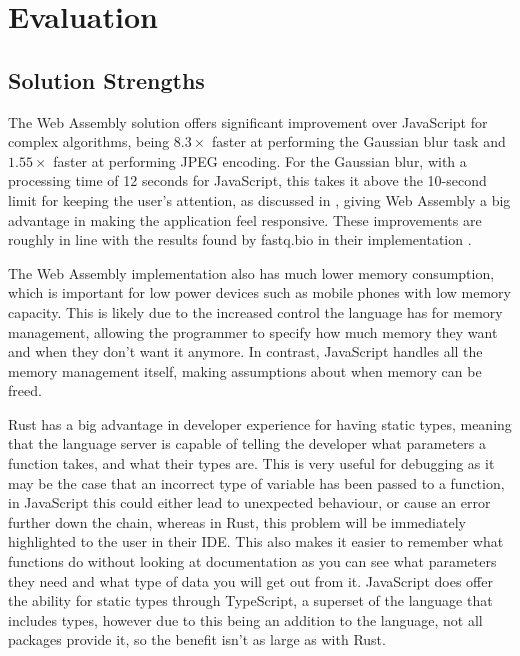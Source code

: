 \documentclass[12pt,a4paper]{article}
\begin{document}
\section{Evaluation}

\subsection{Solution Strengths}

The Web Assembly solution offers significant improvement over JavaScript for complex algorithms, being $8.3 \times$ faster at performing the Gaussian blur task and $1.55 \times$ faster at performing JPEG encoding. For the Gaussian blur, with a processing time of 12 seconds for JavaScript, this takes it above the 10-second limit for keeping the user's attention, as discussed in \cite{nielsen1994usability}, giving Web Assembly a big advantage in making the application feel responsive. These improvements are roughly in line with the results found by fastq.bio in their implementation \cite{fastq}.

The Web Assembly implementation also has much lower memory consumption, which is important for low power devices such as mobile phones with low memory capacity. This is likely due to the increased control the language has for memory management, allowing the programmer to specify how much memory they want and when they don't want it anymore. In contrast, JavaScript handles all the memory management itself, making assumptions about when memory can be freed.

Rust has a big advantage in developer experience for having static types, meaning that the language server is capable of telling the developer what parameters a function takes, and what their types are. This is very useful for debugging as it may be the case that an incorrect type of variable has been passed to a function, in JavaScript this could either lead to unexpected behaviour, or cause an error further down the chain, whereas in Rust, this problem will be immediately highlighted to the user in their IDE. This also makes it easier to remember what functions do without looking at documentation as you can see what parameters they need and what type of data you will get out from it. JavaScript does offer the ability for static types through TypeScript, a superset of the language that includes types, however due to this being an addition to the language, not all packages provide it, so the benefit isn't as large as with Rust.
\end{document}
